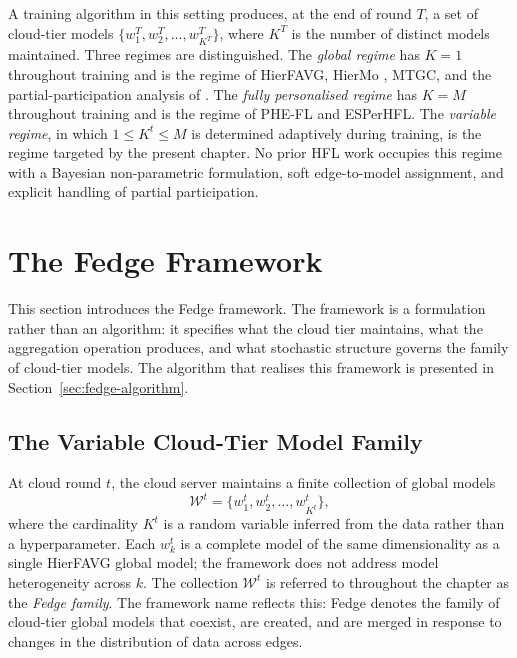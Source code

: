 A training algorithm in this setting produces, at the end of round $T$, a set of cloud-tier models $\{w_{1}^{T}, w_{2}^{T}, \ldots, w_{K^{T}}^{T}\}$, where $K^T$ is the number of distinct models maintained. Three regimes are distinguished. The \emph{global regime} has $K = 1$ throughout training and is the regime of HierFAVG, HierMo \cite{yang2023hiermo}, MTGC, and the partial-participation analysis of \cite{jiang2024partial}. The \emph{fully personalised regime} has $K = M$ throughout training and is the regime of PHE-FL and ESPerHFL. The \emph{variable regime}, in which $1 \leq K^t \leq M$ is determined adaptively during training, is the regime targeted by the present chapter. No prior HFL work occupies this regime with a Bayesian non-parametric formulation, soft edge-to-model assignment, and explicit handling of partial participation.

\section{The Fedge Framework}
\label{sec:fedge-framework}

This section introduces the Fedge framework. The framework is a formulation rather than an algorithm: it specifies what the cloud tier maintains, what the aggregation operation produces, and what stochastic structure governs the family of cloud-tier models. The algorithm that realises this framework is presented in Section~\ref{sec:fedge-algorithm}.

\subsection{The Variable Cloud-Tier Model Family}
\label{subsec:fedge-family}

At cloud round $t$, the cloud server maintains a finite collection of global models
\begin{equation}
\label{eq:fedge-family}
\mathcal{W}^t = \big\{ w_{1}^{t}, w_{2}^{t}, \ldots, w_{K^{t}}^{t} \big\},
\end{equation}
where the cardinality $K^t$ is a random variable inferred from the data rather than a hyperparameter. Each $w_{k}^{t}$ is a complete model of the same dimensionality as a single HierFAVG global model; the framework does not address model heterogeneity across $k$. The collection $\mathcal{W}^t$ is referred to throughout the chapter as the \emph{Fedge family}. The framework name reflects this: Fedge denotes the family of cloud-tier global models that coexist, are created, and are merged in response to changes in the distribution of data across edges.


